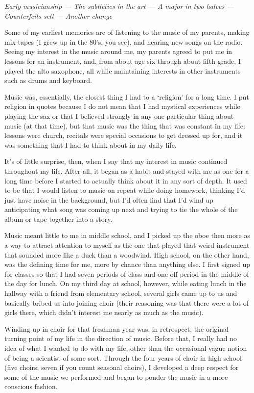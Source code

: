 \emph{Early musicianship --- The subtleties in the art --- A major in two halves --- Counterfeits sell --- Another change}

Some of my earliest memories are of listening to the music of my parents, making mix-tapes (I grew up in the 80's, you see), and hearing new songs on the radio. Seeing my interest in the music around me, my parents agreed to put me in lessons for an instrument, and, from about age six through about fifth grade, I played the alto saxophone, all while maintaining interests in other instruments such as drums and keyboard.

Music was, essentially, the closest thing I had to a `religion' for a long time. I put religion in quotes because I do not mean that I had mystical experiences while playing the sax or that I believed strongly in any one particular thing about music (at that time), but that music was the thing that was constant in my life: lessons were church, recitals were special occasions to get dressed up for, and it was something that I had to think about in my daily life.

It's of little surprise, then, when I say that my interest in music continued throughout my life. After all, it began as a habit and stayed with me as one for a long time before I started to actually think about it in any sort of depth. It used to be that I would listen to music on repeat while doing homework, thinking I'd just have noise in the background, but I'd often find that I'd wind up anticipating what song was coming up next and trying to tie the whole of the album or tape together into a story.

Music meant little to me in middle school, and I picked up the oboe then more as a way to attract attention to myself as the one that played that weird instrument that sounded more like a duck than a woodwind. High school, on the other hand, was the defining time for me, more by chance than anything else. I first signed up for classes so that I had seven periods of class and one off period in the middle of the day for lunch. On my third day at school, however, while eating lunch in the hallway with a friend from elementary school, several girls came up to us and basically bribed us into joining choir (their reasoning was that there were a lot of girls there, which didn't interest me nearly as much as the music).

Winding up in choir for that freshman year was, in retrospect, the original turning point of my life in the direction of music. Before that, I really had no idea of what I wanted to do with my life, other than the occasional vague notion of being a scientist of some sort. Through the four years of choir in high school (five choirs; seven if you count seasonal choirs), I developed a deep respect for some of the music we performed and began to ponder the music in a more conscious fashion.


